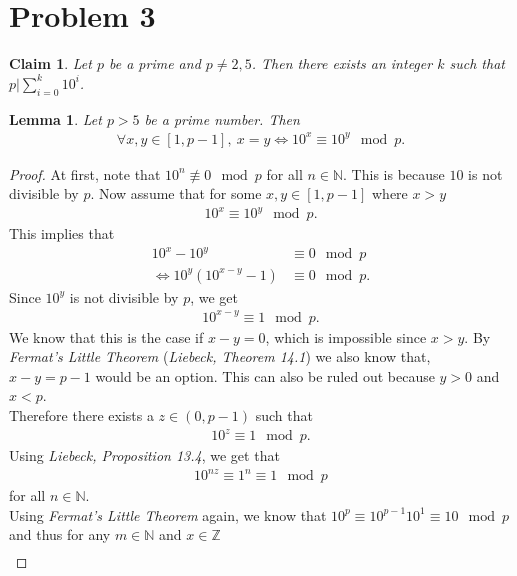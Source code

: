 \documentclass{article}
\newcommand{\N}{\mathbb{N}}
\newcommand{\Z}{\mathbb{Z}}
\newtheorem{claim}[section]{Claim}
\newtheorem{lemma}{Lemma}[section]
\begin{document}
\section*{Problem 3}
\begin{claim}
  Let $p$ be a prime and $p\not=2,5$. Then there exists an integer $k$ such that $p|\sum_{i=0}^k 10^i$.
\end{claim}
\begin{adjustwidth}{2em}{2em}
  \begin{lemma}
    \label{l2}
    Let $p>5$ be a prime number. Then 
    \begin{align*}
      \forall x,y\in[1,p-1],\: x=y \Leftrightarrow 10^x\equiv 10^y\mod p.
    \end{align*}
  \end{lemma} 
  \begin{proof}
    At first, note that $10^n \not\equiv 0 \mod p$ for all $n\in\N$.
    This is because $10$ is not divisible by $p$. 
    Now assume that for some $x,y\in[1,p-1]$ where $x>y$
    \begin{align*}
      10^x \equiv 10^y \mod p.
    \end{align*}
    This implies that
    \begin{align*}
      10^x-10^y&\equiv 0\mod p\\
      \Leftrightarrow 10^y(10^{x-y}-1)&\equiv 0 \mod p.
    \end{align*}
    Since $10^y$ is not divisible by $p$, we get
    \begin{align*}
      10^{x-y}\equiv 1 \mod p.
    \end{align*}
    We know that this is the case if $x-y=0$, which is impossible since $x>y$.
    By \emph{Fermat's Little Theorem} (\emph{Liebeck, Theorem 14.1}) we also know that, $x-y=p-1$ would be an option.
    This can also be ruled out because $y>0$ and $x<p$.\\
    Therefore there exists a $z\in(0,p-1)$ such that
    \begin{align*}
      10^z \equiv 1 \mod p.
    \end{align*}
    Using \emph{Liebeck, Proposition 13.4}, we get that
    \begin{align*}
      10^{nz}\equiv 1^n\equiv 1 \mod p
    \end{align*}
    for all $n\in\N$. \\
    Using \emph{Fermat's Little Theorem} again, we know that $10^p\equiv 10^{p-1}10^1\equiv 10\mod p$ and thus for any $m\in\N$ and $x\in\Z$
    \begin{align*}

\end{align*}
\end{proof}
\end{adjustwidth}
\end{document}
